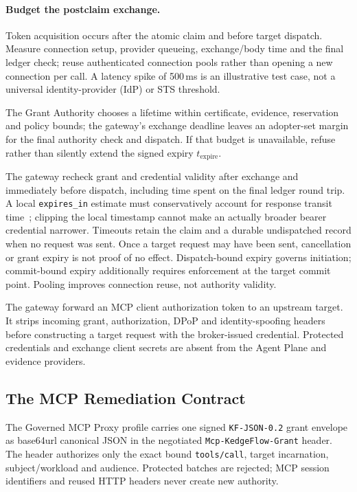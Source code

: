 \paragraph{Budget the postclaim exchange.}
Token acquisition occurs after the atomic claim and before target dispatch. Measure connection setup, provider queueing, exchange/body time and the final ledger check; reuse authenticated connection pools rather than opening a new connection per call. A latency spike of 500\,ms is an illustrative test case, not a universal identity-provider (IdP) or STS threshold.

The Grant Authority chooses a lifetime within certificate, evidence, reservation and policy bounds; the gateway's exchange deadline leaves an adopter-set margin for the final authority check and dispatch. If that budget is unavailable, refuse rather than silently extend the signed expiry $t_{\mathrm{expire}}$.

The gateway  recheck grant and credential validity after exchange and immediately before dispatch, including time spent on the final ledger round trip. A local \texttt{expires\_in} estimate must conservatively account for response transit time~\cite{rfc6749}; clipping the local timestamp cannot make an actually broader bearer credential narrower. Timeouts retain the claim and a durable undispatched record when no request was sent. Once a target request may have been sent, cancellation or grant expiry is not proof of no effect. Dispatch-bound expiry governs initiation; commit-bound expiry additionally requires enforcement at the target commit point. Pooling improves connection reuse, not authority validity.

The gateway  forward an MCP client authorization token to an upstream target. It strips incoming grant, authorization, DPoP and identity-spoofing headers before constructing a target request with the broker-issued credential. Protected credentials and exchange client secrets are absent from the Agent Plane and evidence providers.

\subsection{The MCP Remediation Contract}
\label{sec:mcp-remediation}
The Governed MCP Proxy profile carries one signed \texttt{KF-JSON-0.2} grant envelope as base64url canonical JSON in the negotiated \texttt{Mcp-KedgeFlow-Grant} header. The header authorizes only the exact bound \texttt{tools/call}, target incarnation, subject/workload and audience. Protected batches are rejected; MCP session identifiers and reused HTTP headers never create new authority.

